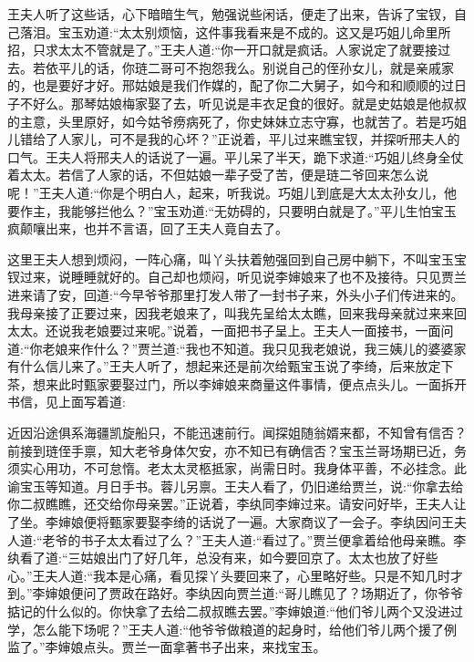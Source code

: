 \begin{parag}
    王夫人听了这些话，心下暗暗生气，勉强说些闲话，便走了出来，告诉了宝钗，自己落泪。宝玉劝道:“太太别烦恼，这件事我看来是不成的。这又是巧姐儿命里所招，只求太太不管就是了。”王夫人道:“你一开口就是疯话。人家说定了就要接过去。若依平儿的话，你琏二哥可不抱怨我么。别说自己的侄孙女儿，就是亲戚家的，也是要好才好。邢姑娘是我们作媒的，配了你二大舅子，如今和和顺顺的过日子不好么。那琴姑娘梅家娶了去，听见说是丰衣足食的很好。就是史姑娘是他叔叔的主意，头里原好，如今姑爷痨病死了，你史妹妹立志守寡，也就苦了。若是巧姐儿错给了人家儿，可不是我的心坏？”正说着，平儿过来瞧宝钗，并探听邢夫人的口气。王夫人将邢夫人的话说了一遍。平儿呆了半天，跪下求道:“巧姐儿终身全仗着太太。若信了人家的话，不但姑娘一辈子受了苦，便是琏二爷回来怎么说呢！”王夫人道:“你是个明白人，起来，听我说。巧姐儿到底是大太太孙女儿，他要作主，我能够拦他么？”宝玉劝道:“无妨碍的，只要明白就是了。”平儿生怕宝玉疯颠嚷出来，也并不言语，回了王夫人竟自去了。
\end{parag}


\begin{parag}
    这里王夫人想到烦闷，一阵心痛，叫丫头扶着勉强回到自己房中躺下，不叫宝玉宝钗过来，说睡睡就好的。自己却也烦闷，听见说李婶娘来了也不及接待。只见贾兰进来请了安，回道:“今早爷爷那里打发人带了一封书子来，外头小子们传进来的。我母亲接了正要过来，因我老娘来了，叫我先呈给太太瞧，回来我母亲就过来来回太太。还说我老娘要过来呢。”说着，一面把书子呈上。王夫人一面接书，一面问道:“你老娘来作什么？”贾兰道:“我也不知道。我只见我老娘说，我三姨儿的婆婆家有什么信儿来了。”王夫人听了，想起来还是前次给甄宝玉说了李绮，后来放定下茶，想来此时甄家要娶过门，所以李婶娘来商量这件事情，便点点头儿。一面拆开书信，见上面写着道:
\end{parag}


\begin{parag}
    近因沿途俱系海疆凯旋船只，不能迅速前行。闻探姐随翁婿来都，不知曾有信否？前接到琏侄手禀，知大老爷身体欠安，亦不知已有确信否？宝玉兰哥场期已近，务须实心用功，不可怠惰。老太太灵柩抵家，尚需日时。我身体平善，不必挂念。此谕宝玉等知道。月日手书。蓉儿另禀。王夫人看了，仍旧递给贾兰，说:“你拿去给你二叔瞧瞧，还交给你母亲罢。”正说着，李纨同李婶过来。请安问好毕，王夫人让了坐。李婶娘便将甄家要娶李绮的话说了一遍。大家商议了一会子。李纨因问王夫人道:“老爷的书子太太看过了么？”王夫人道:“看过了。”贾兰便拿着给他母亲瞧。李纨看了道:“三姑娘出门了好几年，总没有来，如今要回京了。太太也放了好些心。”王夫人道:“我本是心痛，看见探丫头要回来了，心里略好些。只是不知几时才到。”李婶娘便问了贾政在路好。李纨因向贾兰道:“哥儿瞧见了？场期近了，你爷爷掂记的什么似的。你快拿了去给二叔叔瞧去罢。”李婶娘道:“他们爷儿两个又没进过学，怎么能下场呢？”王夫人道:“他爷爷做粮道的起身时，给他们爷儿两个援了例监了。”李婶娘点头。贾兰一面拿著书子出来，来找宝玉。
\end{parag}


